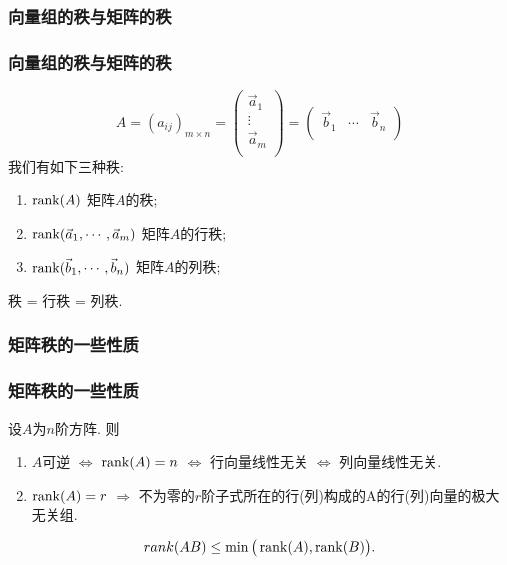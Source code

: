 \subsubsection{向量组的秩与矩阵的秩}
\begin{frame}\frametitle{向量组的秩与矩阵的秩}
\[A=(a_{ij})_{m\times n} = \begin{pmatrix}\vec{a}_1\\\vdots\\\vec{a}_m\\\end{pmatrix} = \begin{pmatrix}\vec{b}_1&\cdots&\vec{b}_n\\\end{pmatrix}\]
\pp
我们有如下三种秩:
\begin{enumerate}
\item $\operatorname{rank}(A)$ \qquad\qquad\qquad 矩阵$A$的秩;
\item $\operatorname{rank}(\vec{a}_1,\cdots,\vec{a}_m)$ \qquad 矩阵$A$的行秩;
\item $\operatorname{rank}(\vec{b}_1,\cdots,\vec{b}_n)$ \qquad 矩阵$A$的列秩;
\end{enumerate}
\pp
\begin{theorem}
\begin{center}
秩 = 行秩 = 列秩.
\end{center}
\end{theorem}

\pp

\end{frame}






\renewcommand{\mydate}{2025年04月15号\ 第十五次课}





\subsubsection{矩阵秩的一些性质}
\begin{frame}\frametitle{矩阵秩的一些性质}
\begin{corollary}
设$A$为$n$阶方阵.
\pp
则
\begin{enumerate}
\item $A$可逆 $\Leftrightarrow$ $\operatorname{rank}(A)=n$ $\Leftrightarrow$ 行向量线性无关 $\Leftrightarrow$ 列向量线性无关.
\pp
\item $\operatorname{rank}(A)=r$ $\Rightarrow$ 不为零的$r$阶子式所在的行(列)构成的A的行(列)向量的极大无关组.
\end{enumerate}
\end{corollary}
\pp
\begin{example}
\[rank(AB)\leq \min\big(\operatorname{rank}(A),\operatorname{rank}(B)\big).\]
\end{example}
\end{frame}









